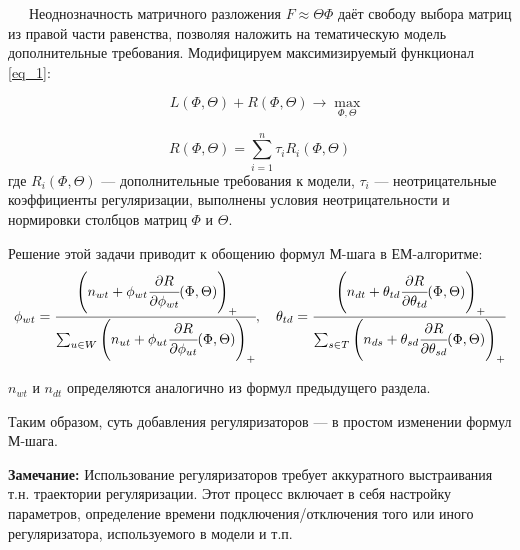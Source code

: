 $\quad\;\:$Неоднозначность матричного разложения $F \approx \Theta \Phi$ даёт свободу выбора матриц из правой части равенства, позволяя наложить на тематическую модель дополнительные требования.  
Модифицируем максимизируемый функционал \ref{eq_1}:

\begin{equation}
	\quad L(\Phi,\Theta) + R(\Phi,\Theta) \rightarrow \max_{\Phi,\Theta}
\end{equation}	

\begin{equation}\label{reg_label}
 	R(\Phi,\Theta) = \sum_{i = 1}^{n} \tau_i R_i(\Phi,\Theta)
\end{equation}
где $R_i(\Phi,\Theta)$ --- дополнительные требования к модели, $\tau_i$ --- неотрицательные  коэффициенты регуляризации, выполнены условия неотрицательности и нормировки столбцов матриц $\Phi$ и $\Theta$.
 	 
Решение этой задачи приводит к обощению формул М-шага в ЕМ-алгоритме:
\begin{equation}
	\phi_{wt} = \cfrac{\left(n_{wt} + \phi_{wt} \cfrac{\partial R}{\partial \phi_{wt}} (\Phi,\Theta) \right)_+}{\sum_{u \in W} \left(n_{ut} + \phi_{ut} \cfrac{\partial R}{\partial \phi_{ut}} (\Phi,\Theta) \right)_+}, \quad 
 	\theta_{td} = \cfrac{\left(n_{dt} + \theta_{td} \cfrac{\partial R}{\partial \theta_{td}} (\Phi,\Theta) \right)_+}{\sum_{s \in T} \left(n_{ds} + \theta_{sd} \cfrac{\partial R}{\partial \theta_{sd}} (\Phi,\Theta) \right)_+}
\end{equation} 
 	 
 	 $n_{wt}$ и $n_{dt}$ определяются аналогично из формул предыдущего раздела.
 	 
Таким образом, суть добавления регуляризаторов --- в простом изменении формул М-шага.

{\bf Замечание:} Использование регуляризаторов требует аккуратного выстраивания т.н. траектории регуляризации. Этот процесс включает в себя настройку параметров, определение времени подключения/отключения того или иного регуляризатора, используемого в модели и т.п.
